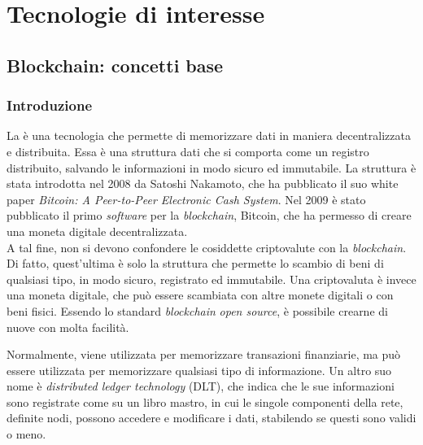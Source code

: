 \chapter{Tecnologie di interesse}\label{cap:tecnologie}


\section{Blockchain: concetti base}\label{sec:tecnologie-blockchain}

\subsection{Introduzione}\label{sec:tecnologie-blockchain-introduzione}

La  è una tecnologia che permette di memorizzare dati in maniera decentralizzata e distribuita.
Essa è una struttura dati che si comporta come un registro distribuito, salvando le informazioni in modo sicuro ed immutabile.
La struttura è stata introdotta nel 2008 da Satoshi Nakamoto, che ha pubblicato il suo white paper \textit{Bitcoin: A Peer-to-Peer Electronic Cash System}.
Nel 2009 è stato pubblicato il primo \textit{software}  per la \textit{blockchain}, Bitcoin, che ha permesso di creare una moneta digitale decentralizzata. \\

A tal fine, non si devono confondere le cosiddette criptovalute con la \textit{blockchain}. Di fatto, quest'ultima è solo la struttura che permette lo scambio di beni di qualsiasi tipo,
in modo sicuro, registrato ed immutabile. Una criptovaluta è invece una moneta digitale, che può essere scambiata con altre monete digitali o con beni fisici.
Essendo lo standard \textit{blockchain} \textit{open source}, è possibile crearne di nuove con molta facilità.

Normalmente, viene utilizzata per memorizzare transazioni finanziarie, ma può essere utilizzata per memorizzare qualsiasi tipo di informazione.
Un altro suo nome è \textit{distributed ledger technology} (DLT), che indica che le sue informazioni sono registrate come su un libro mastro, in cui le singole componenti della rete,
definite nodi, possono accedere e modificare i dati, stabilendo se questi sono validi o meno. 

